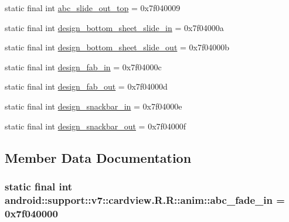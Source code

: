 \begin{CompactItemize}
static final int \hyperlink{classandroid_1_1support_1_1v7_1_1cardview_1_1_r_1_1anim_cf846e5f999918a1d01794f7f6d57c56}{abc\_\-slide\_\-out\_\-top} = 0x7f040009
\item 
static final int \hyperlink{classandroid_1_1support_1_1v7_1_1cardview_1_1_r_1_1anim_f33f91683a6086b3259e4f7502231a8c}{design\_\-bottom\_\-sheet\_\-slide\_\-in} = 0x7f04000a
\item 
static final int \hyperlink{classandroid_1_1support_1_1v7_1_1cardview_1_1_r_1_1anim_615201c430308fd1825da88eee0612a9}{design\_\-bottom\_\-sheet\_\-slide\_\-out} = 0x7f04000b
\item 
static final int \hyperlink{classandroid_1_1support_1_1v7_1_1cardview_1_1_r_1_1anim_616abe6d741dea6adac35be03543c473}{design\_\-fab\_\-in} = 0x7f04000c
\item 
static final int \hyperlink{classandroid_1_1support_1_1v7_1_1cardview_1_1_r_1_1anim_53ebbb406eab8418154be36c0e5d87ac}{design\_\-fab\_\-out} = 0x7f04000d
\item 
static final int \hyperlink{classandroid_1_1support_1_1v7_1_1cardview_1_1_r_1_1anim_55b42aafa3d3fb803d42d0cb87f0d392}{design\_\-snackbar\_\-in} = 0x7f04000e
\item 
static final int \hyperlink{classandroid_1_1support_1_1v7_1_1cardview_1_1_r_1_1anim_b7293e0e2c8d1950e53e8ae1403dfd7f}{design\_\-snackbar\_\-out} = 0x7f04000f
\end{CompactItemize}


\subsection{Member Data Documentation}
\hypertarget{classandroid_1_1support_1_1v7_1_1cardview_1_1_r_1_1anim_d17ee038f86b4023bfe774e0ac8b64a0}{
\subsubsection[{abc\_\-fade\_\-in}]{\setlength{\rightskip}{0pt plus 5cm}static final int android::support::v7::cardview.R.R::anim::abc\_\-fade\_\-in = 0x7f040000}}
\label{classandroid_1_1support_1_1v7_1_1cardview_1_1_r_1_1anim_d17ee038f86b4023bfe774e0ac8b64a0}


